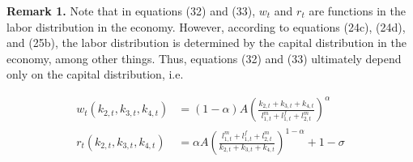 \documentclass[ProjectUYA]{subfiles}
\begin{document}
\textbf{Remark 1.} Note that in equations (32) and (33), $w_t$ and $r_t$ are functions in the labor distribution in the economy. However, according to equations (24c), (24d), and (25b), the labor distribution is determined by the capital distribution in the economy, among other things. Thus, equations (32) and (33) ultimately depend only on the capital distribution, i.e.

\begin{align}
	w_t(k_{2,t},k_{3,t},k_{4,t})
	&=(1-\alpha)A\left(\frac{k_{2,t}+k_{3,t}+k_{4,t}}{l_{1,t}^m+l_{1,t}^f+l_{2,t}^m}\right)^\alpha \label{eq:wageeq}\\
	r_t(k_{2,t},k_{3,t},k_{4,t})
	&=\alpha A\left(\frac{l_{1,t}^m+l_{1,t}^f+l_{2,t}^m}{k_{2,t}+k_{3,t}+k_{4,t}}\right)^{1-\alpha} +1 -\sigma \label{eq:rentaleq}
\end{align}
\end{document}
